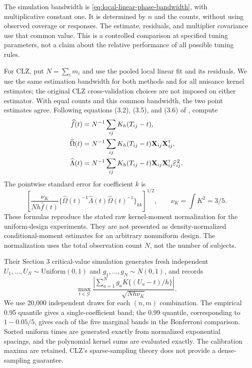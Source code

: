 The simulation bandwidth is \eqref{eq:local-linear-phase-bandwidth}, with multiplicative constant one. It is determined by $n$ and the counts, without using observed coverage or responses. The estimate, residuals, and multiplier covariance use that common value. This is a controlled comparison at specified tuning parameters, not a claim about the relative performance of all possible tuning rules.

For CLZ, put $N=\sum_i m_i$ and use the pooled local linear fit and its residuals. We use the same estimation bandwidth for both methods and for all nuisance kernel estimates; the original CLZ cross-validation choices are not imposed on either estimator. With equal counts and this common bandwidth, the two point estimates agree. Following equations (3.2), (3.5), and (3.6) of \citet{cao_simultaneous_2018}, compute
\begin{align*}
\widehat f(t)&=N^{-1}\sum_{ij}K_h(T_{ij}-t),\\
\widehat\Omega(t)&=N^{-1}\sum_{ij}K_h(T_{ij}-t){\mathbf X}_{ij}{\mathbf X}_{ij}^{\scriptscriptstyle\mathsf{T}},\\
\widehat\Lambda(t)&=N^{-1}\sum_{ij}K_h(T_{ij}-t){\mathbf X}_{ij}{\mathbf X}_{ij}^{\scriptscriptstyle\mathsf{T}}\widehat\varepsilon_{ij}^{\,2}.
\end{align*}
The pointwise standard error for coefficient $k$ is
\[
\left[\frac{\nu_K}{Nh\widehat f(t)}
\{\widehat\Omega(t)^{-1}\widehat\Lambda(t)\widehat\Omega(t)^{-1}\}_{kk}\right]^{1/2},
\qquad \nu_K=\int K^2=3/5.
\]
These formulas reproduce the stated raw kernel-moment normalization for the uniform-design experiments. They are not presented as density-normalized conditional-moment estimates for an arbitrary nonuniform design. The normalization uses the total observation count $N$, not the number of subjects.

Their Section 3 critical-value simulation generates fresh independent $U_1,\ldots,U_N\sim\mathrm{Uniform}(0,1)$ and $g_1,\ldots,g_N\sim N(0,1)$, and records
\[
\max_{t\in\mathcal G}
\frac{\left|\sum_{a=1}^N g_a K\{(U_a-t)/h\}\right|}{\sqrt{N h\nu_K}}.
\]
We use 20,000 independent draws for each $(n,m)$ combination. The empirical 0.95 quantile gives a single-coefficient band; the 0.99 quantile, corresponding to $1-0.05/5$, gives each of the five marginal bands in the Bonferroni comparison. Sorted uniform times are generated exactly from normalized exponential spacings, and the polynomial kernel sums are evaluated exactly. The calibration maxima are retained. CLZ's sparse-sampling theory does not provide a dense-sampling guarantee.

